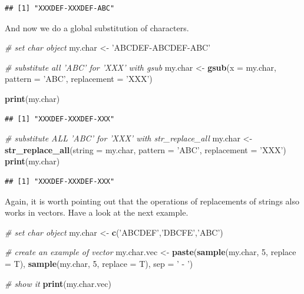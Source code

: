 \documentclass[11pt,]{book}
\newenvironment{Shaded}{\begin{snugshade}}{\end{snugshade}}
\newcommand{\KeywordTok}[1]{\textcolor[rgb]{0.27,0.27,0.27}{\textbf{#1}}}
\newcommand{\DataTypeTok}[1]{\textcolor[rgb]{0.27,0.27,0.27}{#1}}
\newcommand{\DecValTok}[1]{\textcolor[rgb]{0.06,0.06,0.06}{#1}}
\newcommand{\StringTok}[1]{\textcolor[rgb]{0.5,0.5,0.5}{#1}}
\newcommand{\CommentTok}[1]{\textcolor[rgb]{0.56,0.35,0.01}{\textit{#1}}}
\newcommand{\NormalTok}[1]{#1}
\begin{document}
\begin{verbatim}
## [1] "XXXDEF-XXXDEF-ABC"
\end{verbatim}

And now we do a global substitution of characters.

\begin{Shaded}
\begin{Highlighting}[]
\CommentTok{# set char object}
\NormalTok{my.char <-}\StringTok{ 'ABCDEF-ABCDEF-ABC'}

\CommentTok{# substitute all 'ABC' for 'XXX'  with gsub}
\NormalTok{my.char <-}\StringTok{ }\KeywordTok{gsub}\NormalTok{(}\DataTypeTok{x =}\NormalTok{ my.char, }
                \DataTypeTok{pattern =} \StringTok{'ABC'}\NormalTok{, }
                \DataTypeTok{replacement =} \StringTok{'XXX'}\NormalTok{)}
                
\KeywordTok{print}\NormalTok{(my.char)}
\end{Highlighting}
\end{Shaded}

\begin{verbatim}
## [1] "XXXDEF-XXXDEF-XXX"
\end{verbatim}

\begin{Shaded}
\begin{Highlighting}[]
\CommentTok{# substitute ALL 'ABC' for 'XXX' with str_replace_all}
\NormalTok{my.char <-}\StringTok{ }\KeywordTok{str_replace_all}\NormalTok{(}\DataTypeTok{string =}\NormalTok{ my.char, }
                           \DataTypeTok{pattern =} \StringTok{'ABC'}\NormalTok{, }
                           \DataTypeTok{replacement =} \StringTok{'XXX'}\NormalTok{)}
\KeywordTok{print}\NormalTok{(my.char)}
\end{Highlighting}
\end{Shaded}

\begin{verbatim}
## [1] "XXXDEF-XXXDEF-XXX"
\end{verbatim}

Again, it is worth pointing out that the operations of replacements of
strings also works in vectors. Have a look at the next example.

\begin{Shaded}
\begin{Highlighting}[]
\CommentTok{# set char object}
\NormalTok{my.char <-}\StringTok{ }\KeywordTok{c}\NormalTok{(}\StringTok{'ABCDEF'}\NormalTok{,}\StringTok{'DBCFE'}\NormalTok{,}\StringTok{'ABC'}\NormalTok{)}

\CommentTok{# create an example of vector}
\NormalTok{my.char.vec <-}\StringTok{ }\KeywordTok{paste}\NormalTok{(}\KeywordTok{sample}\NormalTok{(my.char, }\DecValTok{5}\NormalTok{, }\DataTypeTok{replace =}\NormalTok{ T),}
                     \KeywordTok{sample}\NormalTok{(my.char, }\DecValTok{5}\NormalTok{, }\DataTypeTok{replace =}\NormalTok{ T), }
                     \DataTypeTok{sep =} \StringTok{' - '}\NormalTok{)}

\CommentTok{# show it}
\KeywordTok{print}\NormalTok{(my.char.vec)}
\end{Highlighting}
\end{Shaded}
\end{document}
